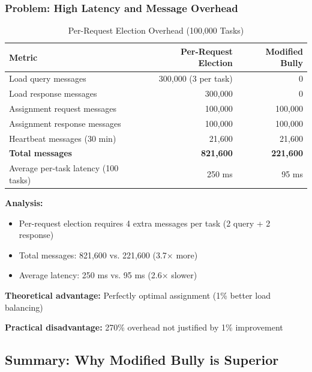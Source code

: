 \documentclass[12pt,a4paper]{article}
\begin{document}
\subsubsection{Problem: High Latency and Message Overhead}

\begin{table}[h]
\centering
\caption{Per-Request Election Overhead (100,000 Tasks)}
\label{tab:per-request}
\begin{tabular}{@{}lrr@{}}
\toprule
\textbf{Metric} & \textbf{Per-Request Election} & \textbf{Modified Bully} \\
\midrule
Load query messages & 300,000 (3 per task) & 0 \\
Load response messages & 300,000 & 0 \\
Assignment request messages & 100,000 & 100,000 \\
Assignment response messages & 100,000 & 100,000 \\
Heartbeat messages (30 min) & 21,600 & 21,600 \\
\textbf{Total messages} & \textbf{821,600} & \textbf{221,600} \\
Average per-task latency (100 tasks) & 250 ms & 95 ms \\
\bottomrule
\end{tabular}
\end{table}

\textbf{Analysis:}
\begin{itemize}
    \item Per-request election requires 4 extra messages per task (2 query + 2 response)
    \item Total messages: 821,600 vs. 221,600 (3.7$\times$ more)
    \item Average latency: 250 ms vs. 95 ms (2.6$\times$ slower)
\end{itemize}

\textbf{Theoretical advantage:} Perfectly optimal assignment (1\% better load balancing)

\textbf{Practical disadvantage:} 270\% overhead not justified by 1\% improvement

\subsection{Summary: Why Modified Bully is Superior}
\end{document}
